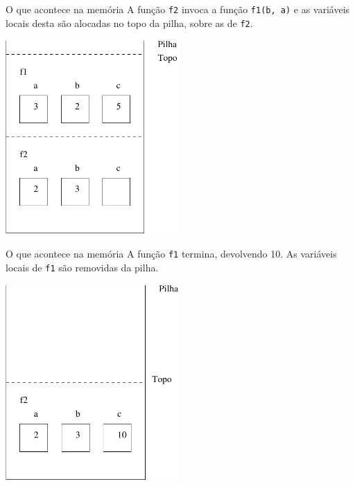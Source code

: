 \documentclass[handout]{beamer}
\newcommand{\cod}[1]{\texttt{#1}}
\begin{document}
\begin{frame}[fragile]{O que acontece na memória}
    A função \cod{f2} invoca a função \cod{f1(b, a)} e as variáveis locais desta são alocadas no topo da pilha, sobre as de \cod{f2}.
    \begin{center}
        \includegraphics[width=0.5\textwidth]{figs/pilha2}
    \end{center}
\end{frame}

\begin{frame}[fragile]{O que acontece na memória}
    A função \cod{f1} termina, devolvendo 10. As variáveis locais de \cod{f1} são removidas da pilha.
    \begin{center}
        \includegraphics[width=0.5\textwidth]{figs/pilha3}
    \end{center}
\end{frame}
\end{document}
